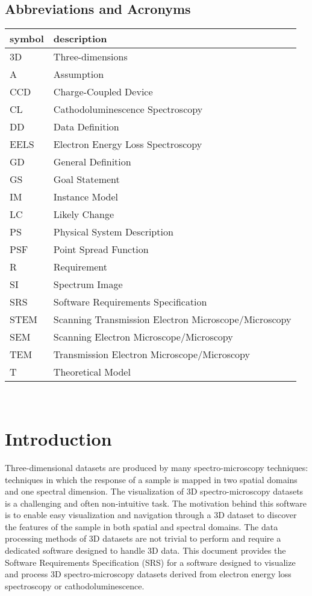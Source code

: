 \documentclass[12pt]{article}
\begin{document}
\subsection{Abbreviations and Acronyms}

\renewcommand{\arraystretch}{1.2}
\begin{tabular}{l l} 
  \toprule		
  \textbf{symbol} & \textbf{description}\\
  \midrule 
  3D & Three-dimensions\\
  A & Assumption\\
  CCD & Charge-Coupled Device\\
  CL & Cathodoluminescence Spectroscopy\\
  DD & Data Definition\\
  EELS & Electron Energy Loss Spectroscopy\\
  GD & General Definition\\
  GS & Goal Statement\\
  IM & Instance Model\\
  LC & Likely Change\\
  PS & Physical System Description\\
  PSF & Point Spread Function\\
  R & Requirement\\
  SI & Spectrum Image\\
  SRS & Software Requirements Specification\\
  STEM & Scanning Transmission Electron Microscope/Microscopy\\
  SEM & Scanning Electron Microscope/Microscopy\\
  TEM & Transmission Electron Microscope/Microscopy\\
  T & Theoretical Model\\
  \bottomrule
\end{tabular}\\

\newpage
{}

\section{Introduction}
Three-dimensional datasets are produced by many spectro-microscopy techniques: techniques in which the response of a sample is mapped in two spatial domains and one spectral dimension. The visualization of 3D spectro-microscopy datasets is a challenging and often non-intuitive task. The motivation behind this software is to enable easy visualization and navigation through a 3D dataset to discover the features of the sample in both spatial and spectral domains. The data processing methods of 3D datasets are not trivial to perform and require a dedicated software designed to handle 3D data. This document provides the Software Requirements Specification (SRS) for a software designed to visualize and process 3D spectro-microscopy datasets derived from electron energy loss spectroscopy or cathodoluminescence.
\end{document}
